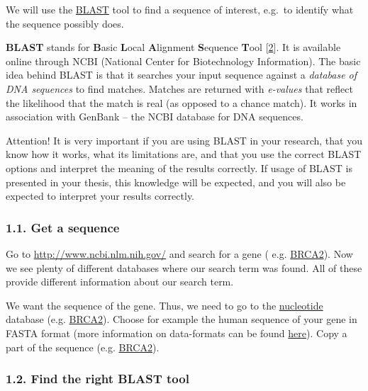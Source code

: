 \documentclass[]{article}
\begin{document}
We will use the \href{http://blast.ncbi.nlm.nih.gov/}{BLAST} tool to
find a sequence of interest, e.g.~to identify what the sequence possibly
does.

\textbf{BLAST} stands for \textbf{B}asic \textbf{L}ocal
\textbf{A}lignment \textbf{S}equence \textbf{T}ool
{[}\href{http://www.ncbi.nlm.nih.gov/pubmed/?term=9254694}{2}{]}. It is
available online through NCBI (National Center for Biotechnology
Information). The basic idea behind BLAST is that it searches your input
sequence against a \emph{database of DNA sequences} to find matches.
Matches are returned with \emph{e-values} that reflect the likelihood
that the match is real (as opposed to a chance match). It works in
association with GenBank -- the NCBI database for DNA sequences.

Attention! It is very important if you are using BLAST in your research,
that you know how it works, what its limitations are, and that you use
the correct BLAST options and interpret the meaning of the results
correctly. If usage of BLAST is presented in your thesis, this knowledge
will be expected, and you will also be expected to interpret your
results correctly.

\subsubsection{1.1. Get a sequence}\label{get-a-sequence}

Go to \url{http://www.ncbi.nlm.nih.gov/} and search for a gene ( e.g.
\href{http://www.ncbi.nlm.nih.gov/gquery/?term=BRCA2}{BRCA2}). Now we
see plenty of different databases where our search term was found. All
of these provide different information about our search term.

We want the sequence of the gene. Thus, we need to go to the
\href{http://www.ncbi.nlm.nih.gov/nuccore}{nucleotide} database (e.g.
\href{http://www.ncbi.nlm.nih.gov/nuccore/?term=BRCA2}{BRCA2}). Choose
for example the human sequence of your gene in FASTA format (more
information on data-formats can be found
\href{http://compbio.massey.ac.nz/wiki/\#!bioinf_files.md}{here}). Copy
a part of the sequence (e.g.
\href{http://www.ncbi.nlm.nih.gov/nuccore/1161383?report=fasta}{BRCA2}).

\subsubsection{1.2. Find the right BLAST
tool}\label{find-the-right-blast-tool}
\end{document}
